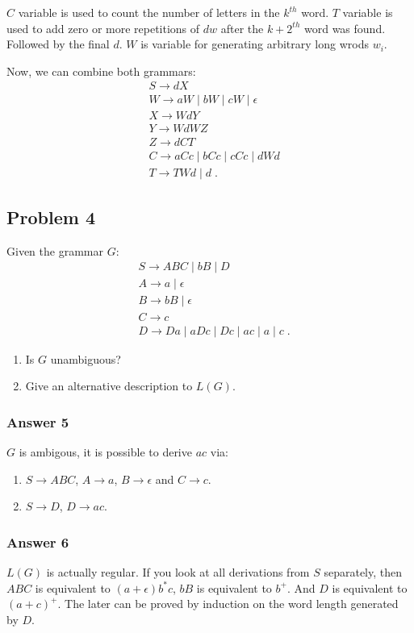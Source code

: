 \documentclass[11pt]{article}
\begin{document}
\(C\) variable is used to count the number of letters in the \(k^{th}\) word.
\(T\) variable is used to add zero or more repetitions of \(dw\) after the
\(k+2^{th}\) word was found.  Followed by the final \(d\).  \(W\) is variable
for generating arbitrary long wrods \(w_i\).


Now, we can combine both grammars:
\begin{align*}
  &S \to dX \\
  &W \to aW \;|\; bW \;|\; cW \;|\; \epsilon \\
  &X \to WdY \\
  &Y \to WdWZ \\
  &Z \to dCT \\
  &C \to aCc \;|\; bCc \;|\; cCc \;|\; dWd \\
  &T \to TWd \;|\; d \;.
\end{align*}

\subsection{Problem 4}
\label{sec:orgheadline10}
Given the grammar \(G\):
\begin{align*}
  &S \to ABC \;|\; bB \;|\; D\\
  &A \to a \;|\; \epsilon \\
  &B \to bB \;|\;\epsilon \\
  &C \to c \\
  &D \to Da \;|\; aDc \;|\; Dc \;|\; ac \;|\; a \;|\; c \;.
\end{align*}


\begin{enumerate}
\item Is \(G\) unambiguous?
\item Give an alternative description to \(L(G)\).
\end{enumerate}

\subsubsection{Answer 5}
\label{sec:orgheadline8}
\(G\) is ambigous, it is possible to derive \(ac\) via:
\begin{enumerate}
\item \(S \to ABC\), \(A \to a\), \(B \to \epsilon\) and \(C \to c\).
\item \(S \to D\), \(D \to ac\).
\end{enumerate}

\subsubsection{Answer 6}
\label{sec:orgheadline9}
\(L(G)\) is actually regular.  If you look at all derivations from \(S\)
separately, then \(ABC\) is equivalent to \((a+\epsilon)b^*c\), \(bB\) is
equivalent to \(b^+\).  And \(D\) is equivalent to \((a+c)^+\).  The later can be
proved by induction on the word length generated by \(D\).
\end{document}
